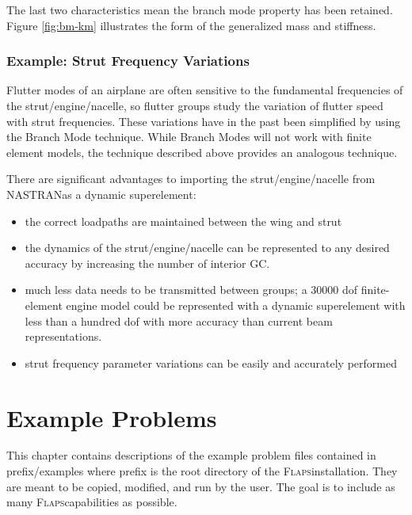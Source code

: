 \documentclass[10pt,openany,twoside]{book}
\numberwithin{equation}{section}   %
\newcommand{\Gc}{GC}
\newcommand{\Flaps}{{\normalfont\scshape Flaps\:}}
\newcommand{\Nastran}{{\footnotesize{NASTRAN\:}}}
\newcommand{\Subst}[1]{{\small\sf #1}}
\begin{document}
The last two characteristics mean the branch mode property has been retained.
Figure \ref{fig:bm-km} illustrates the form of the generalized mass and stiffness.

\subsection{ Example: Strut Frequency Variations}
\par
Flutter modes of an airplane are often sensitive
to the fundamental frequencies of the strut/engine/nacelle,
so flutter groups study the variation of
flutter speed with strut frequencies.
These variations have in the past been simplified
by using the Branch Mode technique.
While Branch Modes will not work with finite element models,
the technique described above
provides an analogous technique.
\par
There are significant advantages to importing
the strut/engine/nacelle from \Nastran as a
dynamic superelement:

\begin{itemize}
\item
the correct loadpaths are maintained between
the wing and strut
\item
the dynamics of the strut/engine/nacelle can be
represented to any desired accuracy
by increasing the number of interior \Gc.
\item
much less data needs to be transmitted between groups;
a 30000 dof finite-element engine model could be represented
with a dynamic superelement with less than a hundred dof
with more accuracy than current beam representations.
\item
strut frequency parameter variations can be easily and
accurately performed
\end{itemize}

\newpage
\chapter{Example Problems}\label{chap:examples}
This chapter contains descriptions of the example problem files
contained in \Subst{prefix}/examples where \Subst{prefix} \index{prefix@\Subst{prefix}}
is the root directory of the \Flaps installation.
They are meant to be copied, modified,
and run by the user. The goal is to include as many \Flaps capabilities
as possible.
\end{document}
